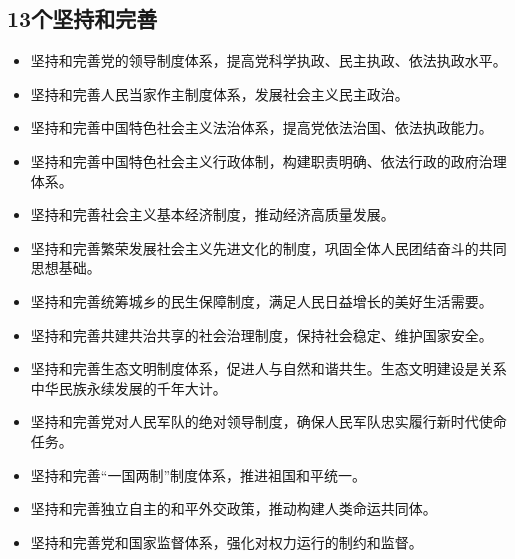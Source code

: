 \documentclass[a4paper, UTF8]{ctexart}
\begin{document}
\subsection{13个坚持和完善}
    \begin{itemize}
        \item 坚持和完善党的领导制度体系，提高党科学执政、民主执政、依法执政水平。
        \item 坚持和完善人民当家作主制度体系，发展社会主义民主政治。
        \item 坚持和完善中国特色社会主义法治体系，提高党依法治国、依法执政能力。
        \item 坚持和完善中国特色社会主义行政体制，构建职责明确、依法行政的政府治理体系。
        \item 坚持和完善社会主义基本经济制度，推动经济高质量发展。
        \item 坚持和完善繁荣发展社会主义先进文化的制度，巩固全体人民团结奋斗的共同思想基础。
        \item 坚持和完善统筹城乡的民生保障制度，满足人民日益增长的美好生活需要。
        \item 坚持和完善共建共治共享的社会治理制度，保持社会稳定、维护国家安全。
        \item 坚持和完善生态文明制度体系，促进人与自然和谐共生。生态文明建设是关系中华民族永续发展的千年大计。
        \item 坚持和完善党对人民军队的绝对领导制度，确保人民军队忠实履行新时代使命任务。
        \item 坚持和完善“一国两制”制度体系，推进祖国和平统一。
        \item 坚持和完善独立自主的和平外交政策，推动构建人类命运共同体。
        \item 坚持和完善党和国家监督体系，强化对权力运行的制约和监督。
    \end{itemize}
    
\end{document}
